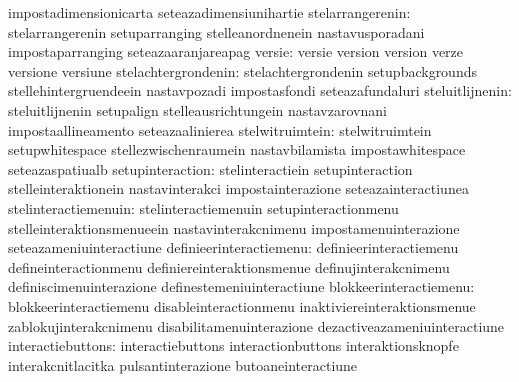                                   impostadimensionicarta           seteazadimensiunihartie
                stelarrangerenin: stelarrangerenin                 setuparranging
                                  stelleanordnenein                nastavusporadani
                                  impostaparranging                seteazaaranjareapag
                          versie: versie                           version
                                  version                          verze
                                  versione                         versiune
             stelachtergrondenin: stelachtergrondenin              setupbackgrounds
                                  stellehintergruendeein           nastavpozadi
                                  impostasfondi                    seteazafundaluri
                 steluitlijnenin: steluitlijnenin                  setupalign
                                  stelleausrichtungein             nastavzarovnani
                                  impostaallineamento              seteazaalinierea
                 stelwitruimtein: stelwitruimtein                  setupwhitespace
                                  stellezwischenraumein            nastavbilamista
                                  impostawhitespace                seteazaspatiualb
                setupinteraction: stelinteractiein                 setupinteraction
                                  stelleinteraktionein             nastavinterakci
                                  impostainterazione               seteazainteractiunea
            stelinteractiemenuin: stelinteractiemenuin             setupinteractionmenu
                                  stelleinteraktionsmenueein       nastavinterakcnimenu
                                  impostamenuinterazione           seteazameniuinteractiune
         definieerinteractiemenu: definieerinteractiemenu          defineinteractionmenu
                                  definiereinteraktionsmenue       definujinterakcnimenu
                                  definiscimenuinterazione         definestemeniuinteractiune
          blokkeerinteractiemenu: blokkeerinteractiemenu           disableinteractionmenu
                                  inaktiviereinteraktionsmenue     zablokujinterakcnimenu
                                  disabilitamenuinterazione        dezactiveazameniuinteractiune
               interactiebuttons: interactiebuttons                interactionbuttons
                                  interaktionsknopfe               interakcnitlacitka
                                  pulsantinterazione               butoaneinteractiune
